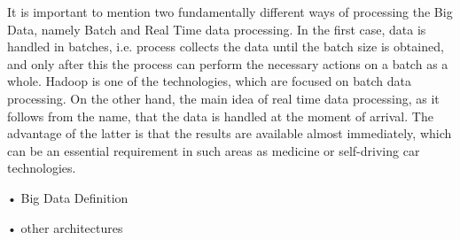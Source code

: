 It is important to mention two fundamentally different ways of processing the Big Data, namely Batch and Real Time data processing. In the first case, data is handled in batches, i.e. process collects the data until the batch size is obtained, and only after this the process can perform the necessary actions on a batch as a whole. Hadoop is one of the technologies, which are focused on batch data processing. On the other hand, the main idea of real time data processing, as it follows from the name, that the data is handled at the moment of arrival. The advantage of the latter is that the results are available almost immediately, which can be an essential requirement in such areas as medicine or self-driving car technologies. 

• Big Data Definition

• other architectures
